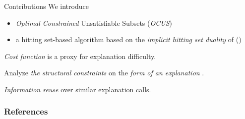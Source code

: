 \documentclass[handout]{beamer}
\newcommand\m[1]{\ensuremath{#1}\xspace}
\newcommand\theory{\ensuremath{\m{F} }\xspace}
\begin{document}
%	
%		
%	
	
	
\begin{frame}{Contributions}
	We introduce 
	\begin{itemize}
		\item 	\emph{\color{vuborange}Optimal Constrained} Unsatisfiable Subsets  (\emph{\color{vuborange}OCUS})
		\item a hitting set-based algorithm based on the \emph{\color{vuborange} implicit hitting set duality} of (\cite{DBLP:journals/jar/LiffitonS08,ai/Reiter87})
	\end{itemize}\pause
	\begin{description}[font=\color{vuborange}\itshape]
		\item[Optimality] \emph{\color{vuborange} Cost function} is a proxy for explanation difficulty.\pause
	\item[Constrainedness]  Analyze \emph{\color{purple}the structural constraints} on the  \emph{\color{vuborange}form of an explanation} .\pause
	\item[Incrementality]  \emph{\color{vuborange} Information reuse} over similar explanation calls. 
	\end{description}
\end{frame}
	
	\begin{frame}[allowframebreaks]
		\frametitle{References}
		
		
	\end{frame}
\end{document}

